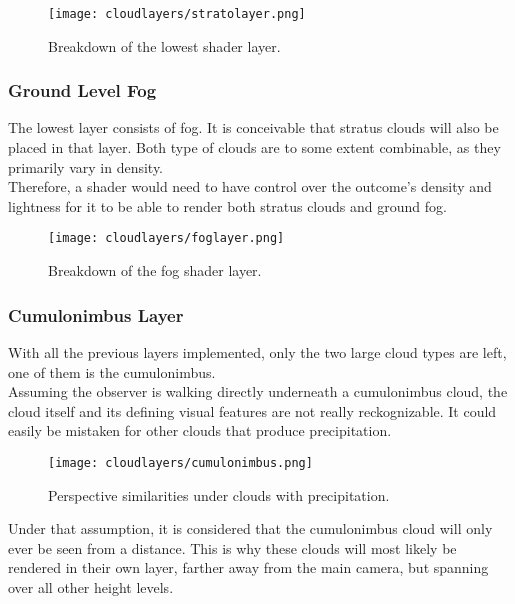 \begin{figure}[H]
    \texttt{[image: cloudlayers/stratolayer.png]}
    \caption{Breakdown of the lowest shader layer.}
    \label{img:cloudlayer:alto}
\end{figure}


\subsubsection{Ground Level Fog}
The lowest layer consists of fog. It is conceivable that stratus clouds will also be placed in that layer.
Both type of clouds are to some extent combinable, as they primarily vary in density.
\\
Therefore, a \gls{shader} would need to have control over the outcome's density and lightness for it to be able to render both stratus clouds and ground fog.

\begin{figure}[H]
    \texttt{[image: cloudlayers/foglayer.png]}
    \caption{Breakdown of the fog shader layer.}
    \label{img:cloudlayer:fog}
\end{figure}

\pagebreak

\subsubsection{Cumulonimbus Layer}
With all the previous layers implemented, only the two large cloud types are left, one of them is the cumulonimbus.
\\
Assuming the observer is walking directly underneath a cumulonimbus cloud, the cloud itself and its defining visual features are not really reckognizable.
It could easily be mistaken for other clouds that produce \gls{precipitation}.

\begin{figure}[H]
    \texttt{[image: cloudlayers/cumulonimbus.png]}
    \caption{Perspective similarities under clouds with \gls{precipitation}.}
    \label{img:cloudlayer:cumulonimbus}
\end{figure}

\noindent
Under that assumption, it is considered that the cumulonimbus cloud will only ever be seen from a distance.
This is why these clouds will most likely be rendered in their own layer, farther away from the main camera, but spanning over all other height levels.

\pagebreak

